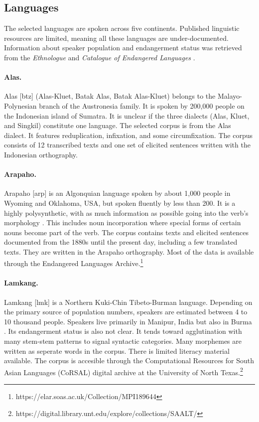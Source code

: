 \subsection{Languages} 

The selected languages are spoken across five continents.
Published linguistic resources are limited, meaning all these languages are under-documented. Information about speaker population and endangerment status was retrieved from the \emph{Ethnologue} \citep{eberhard_ethnologue:2020} and \emph{Catalogue of Endangered Languages} \citep{elcat_2020}.

\paragraph{Alas.}
Alas [btz] (Alas-Kluet, Batak Alas, Batak Alas-Kluet) belongs to the Malayo-Polynesian branch of the Austronesia family. It is spoken by 200,000 people on the Indonesian island of Sumatra. It is unclear if the three dialects (Alas, Kluet, and Singkil) constitute one language. The selected corpus is from the Alas dialect. It features reduplication, infixation, and some circumfixation. The corpus consists of 12 transcribed texts and one set of elicited sentences written with the Indonesian orthography.

\paragraph{Arapaho.}
Arapaho [arp] is an Algonquian language spoken by about 1,000 people in Wyoming and Oklahoma, USA, but spoken fluently by less than 200. It is a highly polysynthetic, with as much information as possible going into the verb's morphology \citep{cowell_arapaho_2008}. This includes noun incorporation where special forms of certain nouns become part of the verb. The corpus contains texts and elicited sentences documented from the 1880s until the present day, including a few translated texts. They are written in the Arapaho orthography. Most of the data is available through the Endangered Languages Archive.\footnote{https://elar.soas.ac.uk/Collection/MPI189644}

\paragraph{Lamkang.} 
Lamkang [lmk] is a Northern Kuki-Chin Tibeto-Burman language. Depending on the primary source of population numbers, speakers are estimated between 4 to 10 thousand people. Speakers live primarily in Manipur, India but also in Burma \cite{lamkang_2007}. Its endangerment status is also not clear. It tends toward agglutination with many stem-stem patterns to signal syntactic categories. Many morphemes are written as seperate words in the corpus. There is limited literacy material available. The corpus is accesible through the Computational Resources for South Asian Languages (CoRSAL) digital archive at the University of North Texas.\footnote{https://digital.library.unt.edu/explore/collections/SAALT/}

